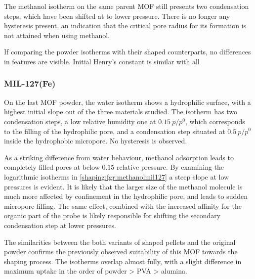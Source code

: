 The methanol isotherm on the same parent MOF still presents 
two condensation steps, which have been shifted at to 
lower pressure. There is no longer any hysteresis present,
an indication that the critical pore radius for its formation
is not attained when using methanol.

If comparing the powder isotherms with their shaped counterparts,
no differences in features are visible. Initial Henry's constant 
is similar with all  

\subsubsection{MIL-127(Fe)}

On the last MOF powder, the water isotherm shows a hydrophilic
surface, with a highest initial slope out of the three 
materials studied. The isotherm has two condensation steps,
a low relative humidity one at \(0.15~p/p^0\), which corresponds
to the filling of the hydrophilic pore, and a condensation 
step situated at \(0.5~p/p^0\) inside the hydrophobic micropore.
No hysteresis is observed.

As a striking difference from water behaviour, methanol adsorption
leads to completely filled pores at below \(0.15\) relative 
pressure. By examining the logarithmic isotherms in 
\autoref{shaping:fgr:methanolmil127} a steep slope at low
pressures is evident. It is likely that the larger size of the
methanol molecule is much more affected by confinement in 
the hydrophilic pore, and leads to sudden micropore filling.
The same effect, combined with the increased affinity for the 
organic part of the probe is likely responsible for shifting the 
secondary condensation step at lower pressures.

The similarities between the both variants of shaped pellets 
and the original powder confirms the previously observed 
suitability of this MOF towards the shaping process. The isotherms
overlap almost fully, with a slight difference in maximum uptake
in the order of powder > PVA > alumina.

